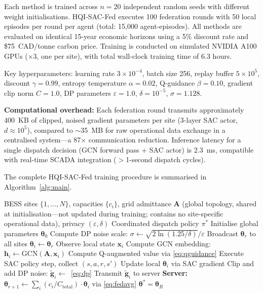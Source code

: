 \documentclass[journal]{IEEEtran}
\begin{document}
Each method is trained across $n = 20$ independent random seeds with
different weight initialisations. HQI-SAC-Fed executes 100 federation
rounds with 50 local episodes per round per agent (total: 15,000
agent-episodes). All methods are evaluated on identical 15-year economic
horizons using a 5\% discount rate and \$75~CAD/tonne carbon price.
Training is conducted on simulated NVIDIA A100 GPUs ($\times$3, one per
site), with total wall-clock training time of 6.3 hours.

Key hyperparameters: learning rate $3 \times 10^{-4}$, batch size 256,
replay buffer $5 \times 10^5$, discount $\gamma = 0.99$, entropy
temperature $\alpha = 0.02$, Q-guidance $\beta = 0.10$, gradient clip
norm $C = 1.0$, DP parameters $\varepsilon = 1.0$,
$\delta = 10^{-5}$, $\sigma = 1.128$.

\textbf{Computational overhead:} Each federation round transmits
approximately 400~KB of clipped, noised gradient parameters per site
(3-layer SAC actor, $d \approx 10^5$), compared to $\sim$35~MB for
raw operational data exchange in a centralised system---a 87$\times$
communication reduction. Inference latency for a single dispatch
decision (GCN forward pass + SAC actor) is 2.3~ms, compatible with
real-time SCADA integration ($>$1-second dispatch cycles).

The complete HQI-SAC-Fed training procedure is summarised in
Algorithm~\ref{alg:main}.

\begin{algorithm}[t]
\caption{HQI-SAC-Fed Training}
\label{alg:main}
\begin{algorithmic}[1]
\REQUIRE BESS sites $\{1,\ldots,N\}$, capacities $\{c_i\}$,
         grid admittance $\mathbf{A}$ (global topology, shared at initialisation---not
         updated during training; contains no site-specific operational data),
         privacy $(\varepsilon,\delta)$
\ENSURE Coordinated dispatch policy $\pi^*$
\STATE Initialise global parameters $\boldsymbol{\theta}_0$
\STATE Compute DP noise scale:
       $\sigma \leftarrow \sqrt{2\ln(1.25/\delta)}/\varepsilon$
  \STATE Broadcast $\boldsymbol{\theta}_r$ to all sites
    \STATE $\boldsymbol{\theta}_i \leftarrow \boldsymbol{\theta}_r$
      \STATE Observe local state $\mathbf{x}_i$
      \STATE Compute GCN embedding:
             $\mathbf{h}_i \leftarrow \mathrm{GCN}(\mathbf{A},\mathbf{x}_i)$
      \STATE Compute Q-augmented value via \eqref{eq:qguidance}
      \STATE Execute SAC policy step, collect $(s,a,r,s')$
      \STATE Update local $\boldsymbol{\theta}_i$ via SAC gradient
    \ENDFOR
    \STATE Clip and add DP noise: $\tilde{\mathbf{g}}_i \leftarrow$~\eqref{eq:dp}
    \STATE Transmit $\tilde{\mathbf{g}}_i$ to server
  \ENDFOR
  \STATE \textbf{Server:}
    $\boldsymbol{\theta}_{r+1} \leftarrow
    \sum_i (c_i/C_{\mathrm{total}})\cdot\boldsymbol{\theta}_i$
    via \eqref{eq:fedavg}
\ENDFOR
\RETURN $\boldsymbol{\theta}^* = \boldsymbol{\theta}_R$
\end{algorithmic}
\end{algorithm}
\end{document}

